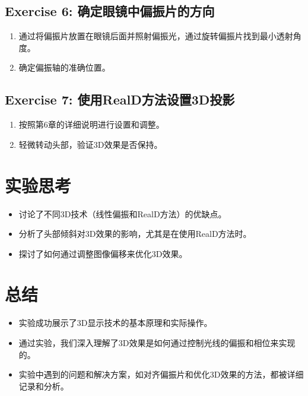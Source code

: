 \documentclass{ctexart}
\begin{document}
\subsection{Exercise 6: 确定眼镜中偏振片的方向}
\begin{enumerate}
    \item 通过将偏振片放置在眼镜后面并照射偏振光，通过旋转偏振片找到最小透射角度。
    \item 确定偏振轴的准确位置。
\end{enumerate}

\subsection{Exercise 7: 使用RealD方法设置3D投影}
\begin{enumerate}
    \item 按照第6章的详细说明进行设置和调整。
    \item 轻微转动头部，验证3D效果是否保持。
\end{enumerate}

\section{实验思考}
\begin{itemize}
    \item 讨论了不同3D技术（线性偏振和RealD方法）的优缺点。
    \item 分析了头部倾斜对3D效果的影响，尤其是在使用RealD方法时。
    \item 探讨了如何通过调整图像偏移来优化3D效果。
\end{itemize}

\section{总结}
\begin{itemize}
    \item 实验成功展示了3D显示技术的基本原理和实际操作。
    \item 通过实验，我们深入理解了3D效果是如何通过控制光线的偏振和相位来实现的。
    \item 实验中遇到的问题和解决方案，如对齐偏振片和优化3D效果的方法，都被详细记录和分析。
\end{itemize}
\end{document}
